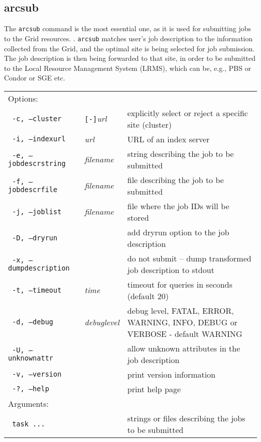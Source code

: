 \subsection{arcsub}\label{sec:arcsub}
The \texttt{arcsub} command is the
most essential one, as it is used for submitting jobs to the Grid
resources. . \texttt{arcsub} matches user's job
description to the information collected from the Grid, and the
optimal site is being selected for job submission. The job description
is then being forwarded to that site, in order to be submitted to the
Local Resource Management System (LRMS), which can be, e.g., PBS or
Condor or SGE etc.

\hspace*{0.5cm}
\begin{shaded}
\end{shaded}
\begin{longtable}{llp{8cm}}
   Options:&&\\
   \texttt{ -c, --cluster}&\verb#[-]#\textit{url}&explicitly select or reject a specific site (cluster)\\
   \texttt{ -i, --indexurl}&\textit{url}&URL of an index server\\
   \texttt{ -e, --jobdescrstring}&\textit{filename}&string describing the job to be submitted\\
   \texttt{ -f, --jobdescrfile}&\textit{filename}&file describing the job to be submitted\\
   \texttt{ -j, --joblist}&\textit{filename}&file where the job IDs will be stored\\
   \texttt{ -D, --dryrun}&&add dryrun option to the job description\\
   \texttt{ -x, --dumpdescription}&&do not submit -- dump transformed job description to stdout\\
   \texttt{ -t, --timeout}&\textit{time}&timeout for queries in seconds (default 20)\\
   \texttt{ -d, --debug}&\textit{debuglevel}&debug level, FATAL, ERROR, WARNING, INFO, DEBUG or VERBOSE - default WARNING\\
   \texttt{ -U, --unknownattr}&&allow unknown attributes in the job description\\
   \texttt{ -v, --version}&&print version information\\
   \texttt{ -?, --help}&&print help page\\
   Arguments:&&\\
   \texttt{ task ...}&&strings or files describing the jobs to be submitted\\
\end{longtable}



